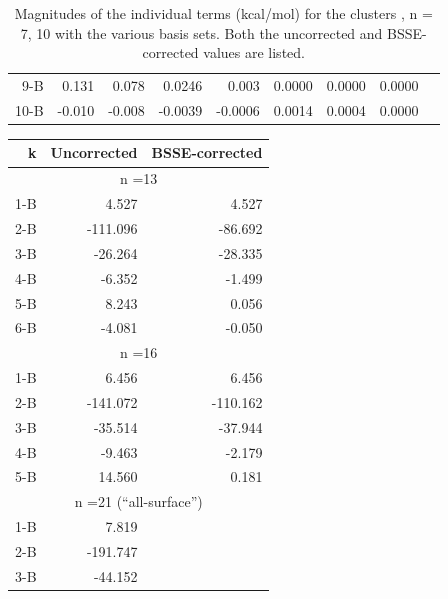 \documentclass[11pt, proquest]{uwthesis}[2020/02/24]
\let\ce\ch
\begin{document}
\begin{table}[]
\begin{tabular}{@{}rrrrrrrrr@{}}
9-B  & 0.131   & 0.078   & 0.0246  & 0.003     & 0.0000  & 0.0000  & 0.0000  &           \\
10-B & -0.010  & -0.008  & -0.0039 & -0.0006   & 0.0014  & 0.0004  & 0.0000  &           \\ \bottomrule
\end{tabular}
\caption[Magnitudes of the individual terms (kcal/mol) for the clusters \ce{(H2O)n}, n = 7, 10 with the various basis sets. Both the uncorrected and BSSE-corrected values are listed.]{Magnitudes of the individual terms (kcal/mol) for the clusters \ce{(H2O)n}, n = 7, 10 with the various basis sets. Both the uncorrected and BSSE-corrected values are listed.}
\label{tab:MBE_I_T1}
\end{table}

\begin{table}[]
\centering
\begin{tabular}{@{}rrr@{}}
\toprule
k       & Uncorrected     & BSSE-corrected     \\ \midrule
\multicolumn{3}{c}{n =13}                      \\
\hline
1-B     & 4.527           & 4.527              \\
2-B     & -111.096        & -86.692            \\
3-B     & -26.264         & -28.335            \\
4-B     & -6.352          & -1.499             \\
5-B     & 8.243           & 0.056              \\
6-B     & -4.081          & -0.050             \\
\hline
\multicolumn{3}{c}{n =16}                      \\
\hline
1-B     & 6.456           & 6.456              \\
2-B     & -141.072        & -110.162           \\
3-B     & -35.514         & -37.944            \\
4-B     & -9.463          & -2.179             \\
5-B     & 14.560          & 0.181              \\
\hline
\multicolumn{3}{c}{n =21 					(“all-surface”)} \\
\hline
1-B     & 7.819           &                    \\
2-B     & -191.747        &                    \\
3-B     & -44.152         &                    \\

\end{tabular}
\end{table}
\end{document}
